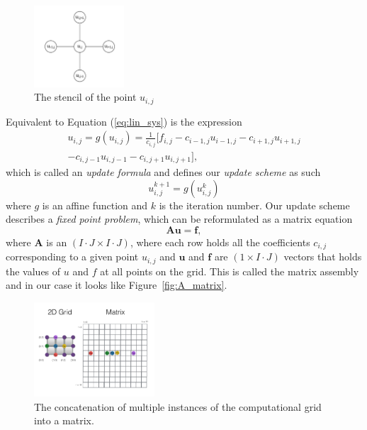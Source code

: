\documentclass[acmtog]{acmart}
\begin{document}
\begin{figure}[H]
  \centering
  \includegraphics[width=0.3\textwidth]{Images/stencil.png}
  \caption{The stencil of the point $u_{i,j}$}
  \Description{}
\end{figure}

Equivalent to Equation (\ref{eq:lin_sys}) is the expression
%
\begin{multline}
  u_{i,j} = g(u_{i,j}) = \frac{1}{c_{i,j}} \Big[f_{i,j} - c_{i-1,j} u_{i-1,j} - c_{i+1,j} u_{i+1,j}\\
    - c_{i,j-1} u_{i,j-1} - c_{i,j+1} u_{i,j+1}\Big],
\end{multline}
%
which is called an \textit{update formula} and defines our \textit{update
  scheme} as such
%
\begin{equation}
  u_{i,j}^{k+1} = g(u_{i,j}^k)
\end{equation}
%
where $g$ is an affine function and $k$ is the iteration number. Our update
scheme describes a \textit{fixed point problem}, which can be reformulated as a
matrix equation
%
\begin{equation}
  \boldsymbol A \boldsymbol u = \boldsymbol f, \label{eq:matrix_eq}
\end{equation}
%
where $\boldsymbol A$ is an \( (I \cdot J \times I \cdot J) \), where each row
holds all the coefficients $c_{i,j}$ corresponding to a given point $u_{i,j}$
and $\boldsymbol u$ and $\boldsymbol f$ are \( (1\times I \cdot J) \) vectors
that holds the values of $u$ and $f$ at all points on the grid. This is called
the matrix assembly and in our case it looks like Figure~\ref{fig:A_matrix}.

\begin{figure}[H]
  \centering
  \includegraphics[width=0.4\textwidth]{Images/grid_to_matrix.png}
  \caption{The concatenation of multiple instances of the computational grid into a matrix.}
  \Description{}
\end{figure}
\end{document}

